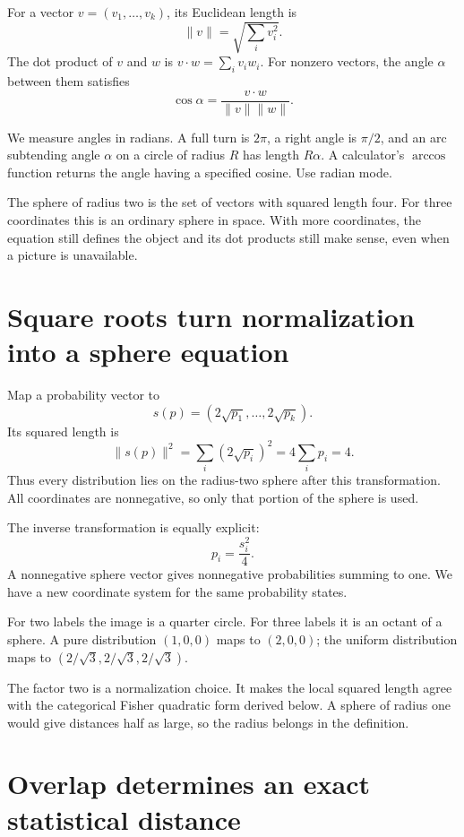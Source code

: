 \documentclass[11pt,oneside,openany]{book}
\theoremstyle{definition}
\theoremstyle{remark}
\numberwithin{equation}{chapter}
\begin{document}
For a vector \(v=(v_1,\ldots,v_k)\), its Euclidean length is \[\|v\|=\sqrt{\sum_i v_i^2}.\] The dot product of \(v\) and \(w\) is \(v\cdot w=\sum_i v_iw_i\). For nonzero vectors, the angle \(\alpha\) between them satisfies \[\cos\alpha=\frac{v\cdot w}{\|v\|\|w\|}.\]

We measure angles in radians. A full turn is \(2\pi\), a right angle is \(\pi/2\), and an arc subtending angle \(\alpha\) on a circle of radius \(R\) has length \(R\alpha\). A calculator's \(\arccos\) function returns the angle having a specified cosine. Use radian mode.

The sphere of radius two is the set of vectors with squared length four. For three coordinates this is an ordinary sphere in space. With more coordinates, the equation still defines the object and its dot products still make sense, even when a picture is unavailable.

\section{Square roots turn normalization into a sphere equation}\label{ch07-square-roots-turn-normalization-into-a-sphere-equation}

Map a probability vector to \[s(p)=(2\sqrt{p_1},\ldots,2\sqrt{p_k}).\] Its squared length is \[\|s(p)\|^2=\sum_i(2\sqrt{p_i})^2=4\sum_i p_i=4.\] Thus every distribution lies on the radius-two sphere after this transformation. All coordinates are nonnegative, so only that portion of the sphere is used.

The inverse transformation is equally explicit: \[p_i=\frac{s_i^2}{4}.\] A nonnegative sphere vector gives nonnegative probabilities summing to one. We have a new coordinate system for the same probability states.

For two labels the image is a quarter circle. For three labels it is an octant of a sphere. A pure distribution \((1,0,0)\) maps to \((2,0,0)\); the uniform distribution maps to \((2/\sqrt3,2/\sqrt3,2/\sqrt3)\).

The factor two is a normalization choice. It makes the local squared length agree with the categorical Fisher quadratic form derived below. A sphere of radius one would give distances half as large, so the radius belongs in the definition.

\section{Overlap determines an exact statistical distance}\label{ch07-overlap-determines-an-exact-statistical-distance}
\end{document}
